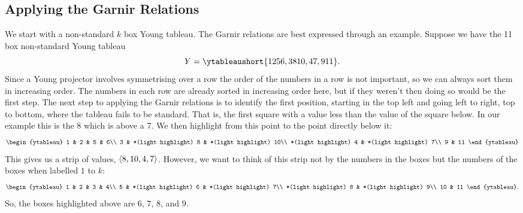 \documentclass[fleqn]{NotesClass}
\DeclarePairedDelimiter{\tuple}{\langle}{\rangle}
\begin{document}
    \subsection{Applying the Garnir Relations}
    We start with a non-standard \(k\) box Young tableau.
    The Garnir relations are best expressed through an example.
    Suppose we have the 11 box non-standard Young tableau
    \begin{equation}
        Y = \ytableaushort{1256,38{10},47,9{11}}.
    \end{equation}
    Since a Young projector involves symmetrising over a row the order of the numbers in a row is not important, so we can always sort them in increasing order.
    The numbers in each row are already sorted in increasing order here, but if they weren't then doing so would be the first step.
    The next step to applying the Garnir relations is to identify the first position, starting in the top left and going left to right, top to bottom, where the tableau fails to be standard.
    That is, the first square with a value less than the value of the square below.
    In our example this is the 8 which is above a 7.
    We then highlight from this point to the point directly below it:
    \begin{equation}
        \begin{ytableau}
            1 & 2 & 5 & 6\\
            3 & *(light highlight) 8 & *(light highlight) 10\\
            *(light highlight) 4 & *(light highlight) 7\\
            9 & 11
        \end{ytableau}
    \end{equation}
    This gives us a strip of values, \(\tuple{8,10,4,7}\).
    However, we want to think of this strip not by the numbers in the boxes but the numbers of the boxes when labelled \(1\) to \(k\):
    \begingroup\setlength\abovedisplayskip{0pt}
    \begin{equation}
        \begin{ytableau}
            1 & 2 & 3 & 4\\
            5 & *(light highlight) 6 & *(light highlight) 7\\
            *(light highlight) 8 & *(light highlight) 9\\
            10 & 11
        \end{ytableau}
        .
    \end{equation}
    \endgroup
    So,  the boxes highlighted above are \(6\), \(7\), \(8\), and \(9\).
    
\end{document}
